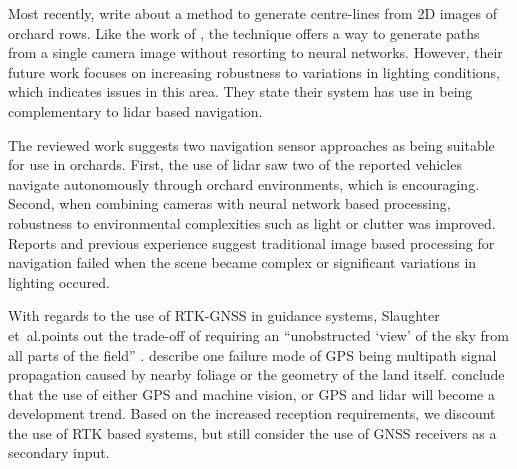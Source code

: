 \documentclass[preprint,authoryear,12pt]{elsarticle}
\begin{document}
        Most recently, \cite{Sharifi2015} write about a method to generate centre-lines from 2D images of orchard rows.
        Like the work of \cite{He2011}, the technique offers a way to generate paths from a single camera image without resorting to neural networks.
        However, their future work focuses on increasing robustness to variations in lighting conditions, which indicates issues in this area.
        They state their system has use in being complementary to lidar based navigation.

        The reviewed work suggests two navigation sensor approaches as being suitable for use in orchards.
        First, the use of lidar saw two of the reported vehicles navigate autonomously through orchard environments, which is encouraging.
        Second, when combining cameras with neural network based processing, robustness to environmental complexities such as light or clutter was improved.
        Reports and previous experience suggest traditional image based processing for navigation failed when the scene became complex or significant variations in lighting occured.


        With regards to the use of RTK-GNSS in guidance systems, Slaughter et~al.\@ points out the trade-off of requiring an ``unobstructed `view' of the sky from all parts of the field'' \citep{Slaughter2008}.
        \cite{Durrant-Whyte2005} describe one failure mode of GPS being multipath signal propagation caused by nearby foliage or the geometry of the land itself.
        \cite{Li2009} conclude that the use of either GPS and machine vision, or GPS and lidar will become a development trend.
        Based on the increased reception requirements, we discount the use of RTK based systems, but still consider the use of GNSS receivers as a secondary input.
\end{document}
